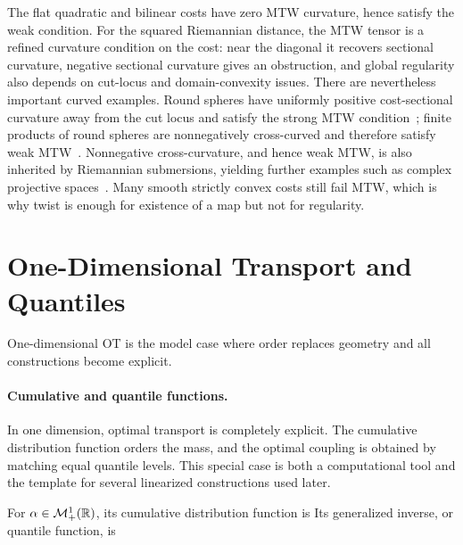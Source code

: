 The flat quadratic and bilinear costs have zero MTW curvature, hence satisfy the weak condition. For the squared Riemannian distance, the MTW tensor is a refined curvature condition on the cost: near the diagonal it recovers sectional curvature, negative sectional curvature gives an obstruction, and global regularity also depends on cut-locus and domain-convexity issues. There are nevertheless important curved examples. Round spheres have uniformly positive cost-sectional curvature away from the cut locus and satisfy the strong MTW condition~\cite{Loeper2011Sphere}; finite products of round spheres are nonnegatively cross-curved and therefore satisfy weak MTW~\cite{KimMcCann2012,FigalliKimMcCann2013}. Nonnegative cross-curvature, and hence weak MTW, is also inherited by Riemannian submersions, yielding further examples such as complex projective spaces~\cite{KimMcCann2012}. Many smooth strictly convex costs still fail MTW, which is why twist is enough for existence of a map but not for regularity.

\section{One-Dimensional Transport and Quantiles}
\label{sec-1d-transport-quantiles}

One-dimensional OT is the model case where order replaces geometry and all constructions become explicit.

\paragraph{Cumulative and quantile functions.}

In one dimension, optimal transport is completely explicit. The cumulative distribution function orders the mass, and the optimal coupling is obtained by matching equal quantile levels. This special case is both a computational tool and the template for several linearized constructions used later.

\begin{defn}\label{def-cdf-quantile}
	For $\alpha\in\mathcal{M}_+^1(\mathbb{R})$, its cumulative distribution function is
	\eql{\label{eq-cumul-defn}
		\cumul{\al}(x)\eqdef\al((-\infty,x]).
	}
	Its generalized inverse, or quantile function, is
\end{defn}

